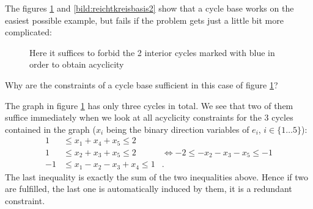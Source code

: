The figures \ref{bild:reichtkreisbasis1} and \ref{bild:reichtkreisbasis2}
show that a cycle base works on the easiest possible example, but fails if the problem gets just a little bit more 
complicated:

\begin{figure}[h!]
\centering
{}
\caption{Here it suffices to forbid the 2 interior cycles marked with blue in order to obtain acyclicity}
\label{bild:reichtkreisbasis1}
\end{figure}

Why are the constraints of a cycle base sufficient in this case of figure \ref{bild:reichtkreisbasis1}? 

The graph in figure \ref{bild:reichtkreisbasis1} has only three cycles in total. We see that two of them 
suffice immediately when we look at all acyclicity constraints for the 3 cycles contained in the graph 
($x_i$ being the binary direction variables of $e_i$, $i\in\{1\dots 5\}$):
\begin{align*}
 1 &\le x_1+x_4+x_5\le 2&\\
 1&\le x_2+x_3+x_5\le 2& \iff -2\le -x_2-x_3-x_5\le -1\\
 -1 &\le x_1-x_2-x_3+x_4 \le 1&.
\end{align*}
The last inequality is exactly the sum of the two inequalities above. Hence if two are fulfilled, the last one is 
automatically induced by them, it is a redundant constraint.

